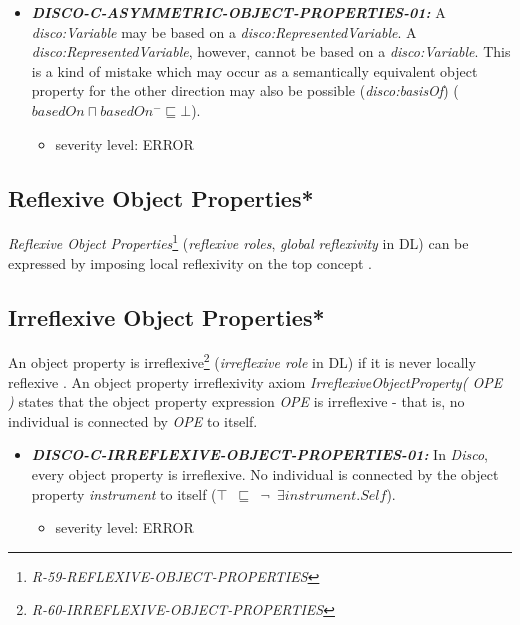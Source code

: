 \documentclass{llncs}
\newcommand{\ms}[1]{\texttt{#1}}
\begin{document}
\begin{itemize}
	\item \textbf{{\em DISCO-C-ASYMMETRIC-OBJECT-PROPERTIES-01:}} 
A {\em disco:Variable} may be based on a {\em disco:RepresentedVariable}.
A {\em disco:RepresentedVariable}, however, cannot be based on a {\em disco:Variable}.
This is a kind of mistake which may occur as a semantically equivalent object property for the other direction may also be possible ({\em disco:basisOf}) (\ms{$basedOn \sqcap basedOn^{-} \sqsubseteq \bot$}).
	\begin{itemize}
		\item severity level: ERROR
	\end{itemize}
\end{itemize}

\subsection{Reflexive Object Properties*}

\emph{Reflexive Object Properties}\footnote{\emph{R-59-REFLEXIVE-OBJECT-PROPERTIES}} (\emph{reflexive roles}, \emph{global reflexivity} in DL) can be expressed by imposing local reflexivity on the top concept \cite{Kroetzsch2012}.

\subsection{Irreflexive Object Properties*}

An object property is irreflexive\footnote{\emph{R-60-IRREFLEXIVE-OBJECT-PROPERTIES}} (\emph{irreflexive role} in DL) if it is never locally reflexive \cite{Kroetzsch2012}.
An object property irreflexivity axiom \emph{IrreflexiveObjectProperty( OPE )} states that the object property expression \emph{OPE} is irreflexive - that is, no individual is connected by \emph{OPE} to itself. 

\begin{itemize}
  \item \textbf{{\em DISCO-C-IRREFLEXIVE-OBJECT-PROPERTIES-01:}}
	In \emph{Disco}, every object property is irreflexive.
  No individual is connected by the object property {\em instrument} to itself (\ms{$\top$ $\sqsubseteq$ $\neg$ $\exists  instrument . Self$}).
	\begin{itemize}
		\item severity level: ERROR
	\end{itemize}
\end{itemize}
\end{document}
